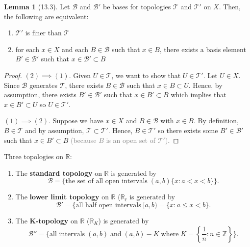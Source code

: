 \documentclass{article}
\newcommand{\nline}{\vspace*{0.5\baselineskip}}
\newcommand{\com}[1]{\textcolor{grey}{#1}}
\theoremstyle{definition}
\newtheorem{lemma}{Lemma}[subsection]
\begin{document}
\begin{flushleft}
\begin{lemma}[13.3]
Let $\mathcal{B}$ and $\mathcal{B}'$ be bases for topologies $\mathcal{T}$ and $\mathcal{T}'$ on $X$. Then, the following are equivalent:

\begin{enumerate}
    \item $\mathcal{T}'$ is finer than $\mathcal{T}$
    \item for each $x \in X$ and each $B \in \mathcal{B}$ such that $x \in B$, there exists a basis element $B' \in \mathcal{B}'$ such that $x \in \mathcal{B}' \subset B$
\end{enumerate}
\end{lemma}

\begin{proof}
$(2) \implies (1)$. Given $U \in \mathcal{T}$, we want to show that $U \in \mathcal{T}'$. Let $
U \in X$. Since $\mathcal{B}$ generates $\mathcal{T}$, there exists $B \in \mathcal{B}$ such that $x \in B \subset U$. Hence, by assumption, there exists $B' \in \mathcal{B}'$ such that $x \in B' \subset B$ which implies that $x \in B' \subset U$ so $U \in \mathcal{T}'$.

\nline

$(1) \implies (2)$. Suppose we have $x \in X$ and $B \in \mathcal{B}$ with $x \in B$. By definition, $B \in \mathcal{T}$ and by assumption, $\mathcal{T} \subset \mathcal{T}'$. Hence, $B \in \mathcal{T}'$ so there exists some $B' \in \mathcal{B}'$ such that $x \in B' \subset B$ \com{(because $B$ is an open set of $\mathcal{T}'$)}.
\end{proof}

Three topologies on $\mathbb{R}$:

\begin{enumerate}
    \item The \textbf{standard topology} on $\mathbb{R}$ is generated by
    \[
    \mathcal{B} = \{ \text{the set of all open intervals} \; (a,b)  \{x : a < x < b\} \}.
    \]
    \item The \textbf{lower limit topology} on $\mathbb{R}$ ($\mathbb{R}_\ell$ is generated by
    \[
    \mathcal{B}' = \{ \text{all half open intervals} \; [a,b) = \{x : a \leq x < b\}.
    \]
    \item The \textbf{K-topology} on $\mathbb{R}$ ($\mathbb{R}_K$) is generated by
    \[
    \mathcal{B}'' = \{ \text{all intervals} \; (a,b) \; \text{and} \; (a,b) - K \; \text{where} \; K = \left\{ \frac{1}{n} : n \in \mathbb{Z} \right\} \}.
    \]
\end{enumerate}


\end{flushleft}
\end{document}
